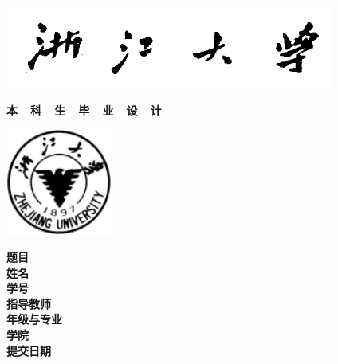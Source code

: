 {
  \setlength{\parindent}{0em}

  {
    \linespread{1}

    \vspace*{-1em}

    \begin{center}
      \includegraphics[width=108mm]{images/xiaoming}
    \end{center}

    \vspace{-1.5em}

    {
      \songti\erhao\bfseries
      \centering
      本~~科~~生~~毕~~业~~设~~计 \par
    }

    \vspace{1em}

    \begin{center}
      \includegraphics[width=35mm]{images/xiaobiao}
    \end{center}
  }

  \vspace{9em}

  {
    \linespread{1.6}
    \songti\sanhao\bfseries
    \centering
    \newlength{\titlelength}
    \setlength{\titlelength}{22em}
    题目 \; \underline{\makebox[\titlelength]{\zjutitlec}} \\
    姓名 \; \underline{\makebox[\titlelength]{\zjuauthornamec}} \\
    学号 \; \underline{\makebox[\titlelength]{\zjuauthorid}} \\
    指导教师 \; \underline{\makebox[\titlelength - 2em]{\zjumentorc}} \\
    年级与专业 \; \underline{\makebox[\titlelength - 3em]{\zjugrade \; \zjumajorc}} \\
    学院 \; \underline{\makebox[\titlelength]{\zjucollegec}} \\
    提交日期 \; \underline{\makebox[\titlelength - 2em]{\zjudatec}} \par
  }
}
